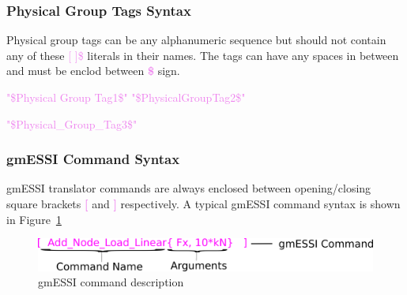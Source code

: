 \documentclass[11pt]{article}
\newcommand{\rcancel}[1]{\renewcommand\CancelColor{\color{red}}\xcancel{#1}}
\begin{document}
\subsubsection{Physical Group Tags Syntax}

Physical  group tags can be any alphanumeric sequence but should not contain any
of  these  \textcolor{violet}{[  ]\$} literals in their names. The tags can have
any spaces in between and must be enclod between \textcolor{violet}{\textbf{\$}} sign.\\
\centerline       {\textcolor{violet}{"\$Physical       Group      Tag1\$"      
"\$PhysicalGroupTag2\$"}                 \rcancel{\textcolor{violet}{"\$Physical
\$GroupTag3\$"}}}

\centerline{\rcancel{\textcolor{violet}{"\$Physical              [GroupTag3\$"}}
\textcolor{violet}{"\$Physical\_Group\_Tag3\$"}
\rcancel{\textcolor{violet}{"\$Physical GroupTag3"}}}

\subsubsection{gmESSI Command Syntax}

gmESSI translator commands are always enclosed between opening/closing square brackets 
\textbf{\textcolor{violet}{[}} and \textbf{\textcolor{violet}{]}} respectively. 
A typical gmESSI command syntax is shown in Figure~\ref{gmESSI-command}

\begin{figure}[h]
  \includegraphics[scale=1.8]{Images/gmESSICommandSyntax.png}
  \centering
  \caption{\label{gmESSI-command} gmESSI command description}
\end{figure}
\end{document}
